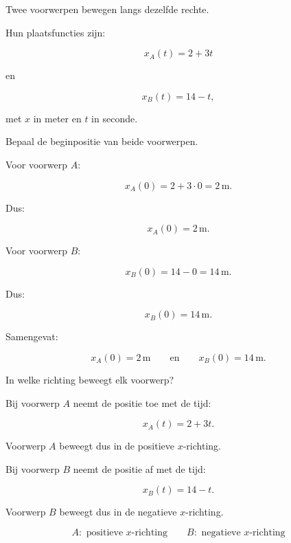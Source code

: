 \documentclass{ximera}
\begin{document}
  \begin{oefening}{\oefU}
  
  Twee voorwerpen bewegen langs dezelfde rechte.
  
  Hun plaatsfuncties zijn:
  
  \[
  x_A(t)=2+3t
  \]
  
  en
  
  \[
  x_B(t)=14-t,
  \]
  
  met $x$ in meter en $t$ in seconde.
  
  \begin{question}
  Bepaal de beginpositie van beide voorwerpen.
  
  \begin{oplossing}
  Voor voorwerp $A$:
  
  \[
  x_A(0)
  =
  2+3\cdot0
  =
  2\,\mathrm{m}.
  \]
  
  Dus:
  
  \[
  x_A(0)=2\,\mathrm{m}.
  \]
  
  Voor voorwerp $B$:
  
  \[
  x_B(0)
  =
  14-0
  =
  14\,\mathrm{m}.
  \]
  
  Dus:
  
  \[
  x_B(0)=14\,\mathrm{m}.
  \]
  
  Samengevat:
  
  \[
  \boxed{x_A(0)=2\,\mathrm{m}}
  \qquad\text{en}\qquad
  \boxed{x_B(0)=14\,\mathrm{m}}.
  \]
  \end{oplossing}
  \end{question}
  
  
  \begin{question}
  In welke richting beweegt elk voorwerp?
  
  \begin{oplossing}
  Bij voorwerp $A$ neemt de positie toe met de tijd:
  
  \[
  x_A(t)=2+3t.
  \]
  
  Voorwerp $A$ beweegt dus in de positieve $x$-richting.
  
  Bij voorwerp $B$ neemt de positie af met de tijd:
  
  \[
  x_B(t)=14-t.
  \]
  
  Voorwerp $B$ beweegt dus in de negatieve $x$-richting.
  
  \[
  \boxed{
  A:\text{ positieve }x\text{-richting}
  \qquad
  B:\text{ negatieve }x\text{-richting}
  }
  \]
  \end{oplossing}
  \end{question}
  

\end{oefening}
\end{document}
